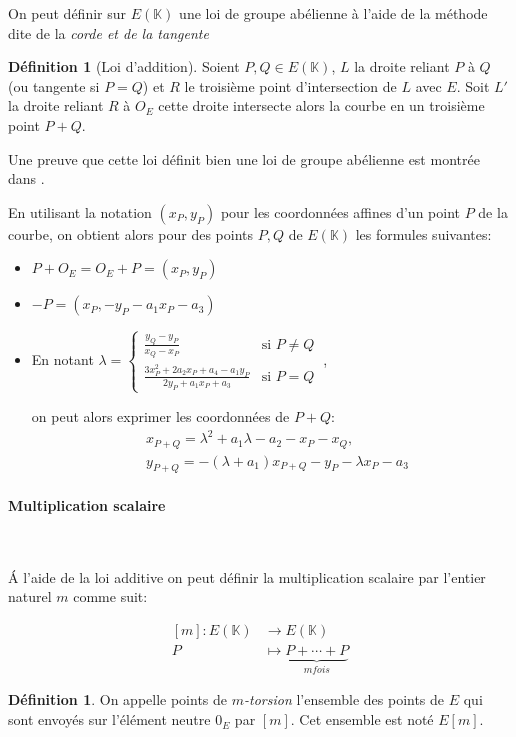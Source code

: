 \documentclass[10pt,a4paper]{book}
\theoremstyle{plain}
\theoremstyle{definition}
\theoremstyle{definition}
\theoremstyle{definition}
\theoremstyle{definition}
\newtheorem{defi}[thm]{Définition}
\theoremstyle{remark}
\theoremstyle{remark}
\theoremstyle{definition}
\begin{document}
On peut définir sur $E(\mathbb{K})$ une loi de groupe abélienne à l'aide de la méthode dite de la \emph{corde et de la tangente}

\begin{defi}[Loi d'addition]
Soient $P,Q \in E(\mathbb{K})$, $L$ la droite reliant $P$ à $Q$ (ou tangente si $P=Q$) et $R$ le troisième point d'intersection de $L$ avec $E$. Soit $L'$ la droite reliant $R$ à $O_E$ cette droite intersecte alors la courbe en un troisième point $P+Q$.
\end{defi}

Une preuve que cette loi définit bien une loi de groupe abélienne est montrée dans \cite[III.2.2]{Silv1}.

En utilisant la notation $(x_P,y_P)$ pour les coordonnées affines d'un point $P$ de la courbe, on obtient alors pour des points $P,Q$ de $E(\mathbb{K})$ les formules suivantes:
\begin{itemize}
\item $P+O_E=O_E+P=(x_P,y_P)$
\item $-P=(x_P,-y_P-a_1x_P-a_3)$
\item En notant $\lambda= \begin{cases}
\frac{y_{Q}-y_{P}}{x_{Q}-x_{P}} & \text{si } P\neq Q\\
\frac{3x_{P}^{2}+2a_{2}x_{P}+a_{4}-a_{1}y_{P}}{2y_{P}+a_{1}x_{P}+a_{3}} & \text{si } P=Q
\end{cases}\ $,

on peut alors exprimer les coordonnées de $P+Q$:
\begin{equation*}
\begin{alignedat}{1}
& x_{P+Q}=\lambda^2 +a_1\lambda-a_2-x_P-x_Q,\\
& y_{P+Q}=-(\lambda +a_1)x_{P+Q}-y_{P}-\lambda x_P-a_3
\end{alignedat}
\end{equation*}
\end{itemize}




\paragraph*{Multiplication scalaire}\   {
\newline


\'A l'aide de la loi additive on peut définir la multiplication scalaire par l'entier naturel $m$ comme suit:

\begin{equation}
\begin{alignedat}{1}
[m]: E(\mathbb{K}) & \rightarrow E(\mathbb{K}) \\
P & \mapsto \underbrace{P+ \cdots +P}_{m fois} 
\end{alignedat}
\end{equation}

\begin{defi}
On appelle points de \emph{$m$-torsion} l'ensemble des points de $E$ qui sont envoyés sur l'élément neutre $0_E$ par $[m]$. Cet ensemble est noté $E[m]$.
\end{defi}
}
\end{document}

